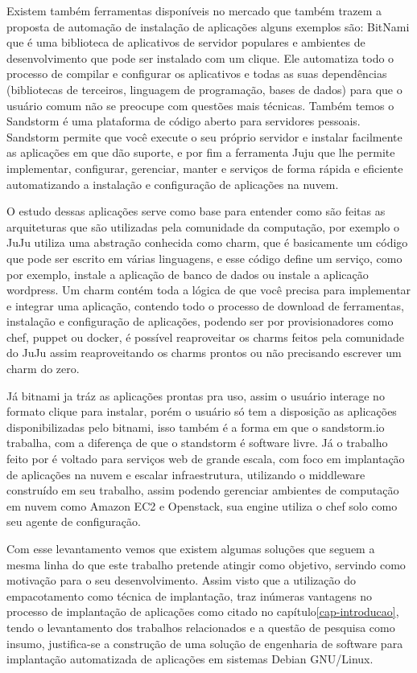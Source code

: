Existem também ferramentas disponíveis no mercado que também trazem a proposta
de automação de instalação de aplicações alguns exemplos são:\cite{bitnami}
BitNami que é uma biblioteca de aplicativos de servidor populares e ambientes de
desenvolvimento que pode ser instalado com um clique. Ele automatiza todo o
processo de compilar e configurar os aplicativos e todas as suas dependências
(bibliotecas de terceiros, linguagem de programação, bases de dados) para que o
usuário comum não se preocupe com questões mais técnicas. Também temos o\cite{sandstormio}
Sandstorm é uma plataforma de código aberto para servidores
pessoais. Sandstorm permite que você execute o seu próprio servidor e instalar
facilmente as aplicações em que dão suporte, e por fim a ferramenta\cite{juju}
Juju que lhe permite implementar, configurar, gerenciar, manter e serviços de forma
rápida e eficiente automatizando a instalação e configuração de aplicações na nuvem.

O estudo dessas aplicações serve como base para entender como são feitas as
arquiteturas que são utilizadas pela comunidade da computação, por exemplo o JuJu
utiliza uma abstração conhecida como charm, que é basicamente um código que pode ser
escrito em várias linguagens, e esse código define um serviço, como por exemplo,
instale a aplicação de banco de dados ou instale a aplicação wordpress. Um charm
contém toda a lógica de que você precisa para implementar e integrar uma aplicação,
contendo todo o processo de download de ferramentas, instalação e configuração de
aplicações, podendo ser por provisionadores como chef, puppet ou docker\cite{juju},
é possível reaproveitar os charms feitos pela comunidade do JuJu assim
reaproveitando os charms prontos ou não precisando escrever um charm do zero.

Já bitnami ja tráz as aplicações
prontas pra uso, assim o usuário interage no formato clique para instalar, porém
o usuário só tem a disposição as aplicações disponibilizadas pelo bitnami, isso
também é a forma em que o sandstorm.io trabalha, com a diferença de que o standstorm é
software livre. Já o trabalho feito por\cite{leo2014} é voltado para serviços web
de grande escala, com foco em implantação de aplicações na nuvem e escalar infraestrutura, utilizando o middleware
construído em seu trabalho, assim podendo gerenciar ambientes de computação em nuvem
como Amazon EC2 e Openstack, sua engine utiliza o chef solo como seu agente de configuração.

Com esse levantamento vemos que existem algumas soluções que seguem a mesma
linha do que este trabalho pretende atingir como objetivo, servindo como motivação
para o seu desenvolvimento. Assim visto que a utilização do empacotamento
como técnica de implantação, traz inúmeras vantagens no processo de implantação
de aplicações como citado no capítulo\ref{cap-introducao}, tendo o levantamento
dos trabalhos relacionados e a questão de pesquisa como insumo, justifica-se a
construção de uma solução de engenharia de software para implantação automatizada
de aplicações em sistemas Debian GNU/Linux.

